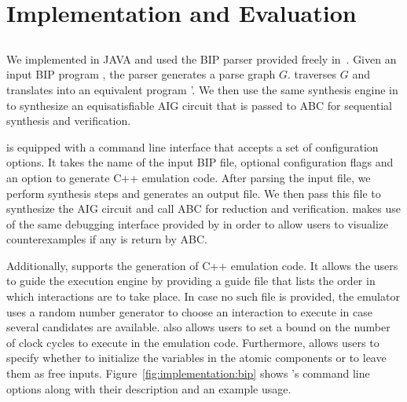 \section{Implementation and Evaluation}
\label{sect-implem}



\subsection{\biptool{}} \label{chap:implementation:bip}
We implemented \biptool{} in JAVA and used the BIP parser provided 
freely in~\cite{verimagbiponline}. Given an input BIP program \Pm, 
the parser generates a parse graph $G$. \biptool{} traverses $G$ 
and translates \Pm into an equivalent \thislanguage{} program 
\Pm'. We then use the same synthesis engine in \mytool{} to synthesize
an equisatisfiable AIG circuit \aigcircuit{} that is passed to ABC 
for sequential synthesis and verification.

\biptool{} is equipped with a command line interface that accepts a set
of configuration options. It takes the name of the input BIP file, optional 
configuration flags and an option to generate C++ emulation code. After 
parsing the input file, we perform synthesis steps and generates 
an output \thislanguage{} file. 
We then pass this file to synthesize the AIG circuit \aigcircuit{}
and call ABC for reduction and verification. \biptool{} makes use of the same debugging
interface provided by \mytool{} in order to allow users to visualize counterexamples
if any is return by ABC. 

Additionally, \biptool{} supports the generation of C++ emulation code. It allows
the users to guide the execution engine by providing a guide file
that lists the order in which interactions are to take place. In case no such file 
is provided, the emulator uses a random number generator to choose an interaction to execute
in case several candidates  are available. \biptool{} also allows
users to set a bound on the number of clock cycles to execute in the emulation code. 
Furthermore, \biptool{} allows users to specify whether to initialize the variables 
in the atomic components or to leave them as free inputs. Figure~\ref{fig:implementation:bip}
shows \biptool's command line options along with their description and an example usage. 


